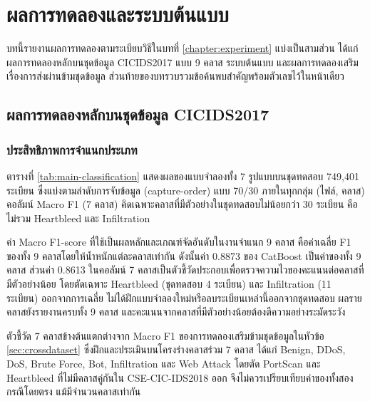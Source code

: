 \chapter{ผลการทดลองและระบบต้นแบบ}
\label{chapter:result}

บทนี้รายงานผลการทดลองตามระเบียบวิธีในบทที่ \ref{chapter:experiment} แบ่งเป็นสามส่วน ได้แก่ ผลการทดลองหลักบนชุดข้อมูล CICIDS2017 แบบ 9 คลาส ระบบต้นแบบ และผลการทดลองเสริมเรื่องการส่งผ่านข้ามชุดข้อมูล ส่วนท้ายของบทรวบรวมข้อค้นพบสำคัญพร้อมตัวเลขไว้ในหน้าเดียว

\section{ผลการทดลองหลักบนชุดข้อมูล CICIDS2017}
\label{sec:main-results}

\subsection{ประสิทธิภาพการจำแนกประเภท}
\label{sec:main-classification}

ตารางที่ \ref{tab:main-classification} แสดงผลของแบบจำลองทั้ง 7 รูปแบบบนชุดทดสอบ 749,401 ระเบียน ซึ่งแบ่งตามลำดับการจับข้อมูล (capture-order) แบบ 70/30 ภายในทุกกลุ่ม (ไฟล์, คลาส) คอลัมน์ Macro F1 (7 คลาส) คิดเฉพาะคลาสที่มีตัวอย่างในชุดทดสอบไม่น้อยกว่า 30 ระเบียน คือไม่รวม Heartbleed และ Infiltration

ค่า Macro F1-score ที่ใช้เป็นผลหลักและเกณฑ์จัดอันดับในงานจำแนก 9 คลาส คือค่าเฉลี่ย F1 ของทั้ง 9 คลาสโดยให้น้ำหนักแต่ละคลาสเท่ากัน ดังนั้นค่า 0.8873 ของ CatBoost เป็นค่าของทั้ง 9 คลาส ส่วนค่า 0.8613 ในคอลัมน์ 7 คลาสเป็นตัวชี้วัดประกอบเพื่อตรวจความไวของคะแนนต่อคลาสที่มีตัวอย่างน้อย โดยตัดเฉพาะ Heartbleed (ชุดทดสอบ 4 ระเบียน) และ Infiltration (11 ระเบียน) ออกจากการเฉลี่ย ไม่ได้ฝึกแบบจำลองใหม่หรือลบระเบียนเหล่านี้ออกจากชุดทดสอบ ผลรายคลาสยังรายงานครบทั้ง 9 คลาส และคะแนนจากคลาสที่มีตัวอย่างน้อยต้องตีความอย่างระมัดระวัง

ตัวชี้วัด 7 คลาสข้างต้นแตกต่างจาก Macro F1 ของการทดลองเสริมข้ามชุดข้อมูลในหัวข้อ \ref{sec:crossdataset} ซึ่งฝึกและประเมินบนโครงร่างคลาสร่วม 7 คลาส ได้แก่ Benign, DDoS, DoS, Brute Force, Bot, Infiltration และ Web Attack โดยตัด PortScan และ Heartbleed ที่ไม่มีคลาสคู่กันใน CSE-CIC-IDS2018 ออก จึงไม่ควรเปรียบเทียบค่าของทั้งสองกรณีโดยตรง แม้มีจำนวนคลาสเท่ากัน


